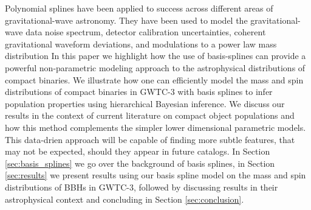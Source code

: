 Polynomial splines have been applied to success across different areas of gravitational-wave astronomy. They have been used to model the gravitational-wave data noise spectrum, 
detector calibration uncertainties, coherent gravitational waveform deviations, and modulations to a power law mass distribution \cite{Littenberg_2015,Edwards_2018,B_Farr_etal_2014,Edelman_2021,Edelman_2022ApJ}
In this paper we highlight how the use of basis-splines can provide a powerful non-parametric modeling approach to the astrophysical distributions of compact 
binaries. We illustrate how one can efficiently model the mass and spin distributions of compact binaries in GWTC-3 with basis splines to infer population properties using 
hierarchical Bayesian inference. We discuss our results in the context of current literature on compact object populations and how this method complements the simpler lower dimensional parametric models. 
This data-drien approach will be capable of finding more subtle features, that may not be expected, should they appear in future catalogs. 
In Section \ref{sec:basis_splines} we go over the background of basis splines, in Section \ref{sec:results} we present results using our basis 
spline model on the mass and spin distributions of BBHs in GWTC-3, followed by discussing results in their astrophysical context and concluding in Section \ref{sec:conclusion}.
